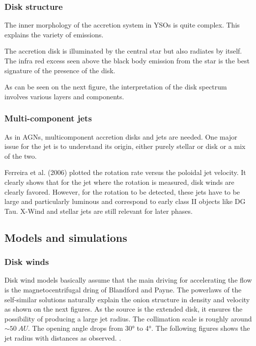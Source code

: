 \documentclass[10pt,a4paper,english,draft]{article}
\begin{document}
\subsubsection{Disk structure}

The inner morphology of the accretion system in YSOs is quite complex. This explains the variety of emissions.

The accretion disk is illuminated by the central star but also radiates by itself. The infra red excess seen above the black body emission from the star is the best signature of the presence of the disk.

As can be seen on the next figure, the interpretation of the disk spectrum involves various layers and components.

\subsubsection{Multi-component jets}
As in AGNs, multicomponent accretion disks and jets are needed. One major issue for the jet is to understand its origin, either purely stellar or disk or a mix of the two.

Ferreira et al. (2006) plotted the rotation rate versus the poloidal jet velocity. It clearly shows that for the jet where the rotation is measured, disk winds are clearly favored. However, for the rotation to be detected, these jets have to be large and particularly luminous and correspond to early class II objects like DG Tau. X-Wind and stellar jets are still relevant for later phases.
\subsection{Models and simulations}

\subsubsection{Disk winds}
Disk wind models basically assume that the main driving for accelerating the flow is the magnetocentrifugal dring of Blandford and Payne. The powerlaws of the self-similar solutions naturally explain the onion structure in density and velocity as shown on the next figures.
As the source is the extended disk, it ensures the possibility of producing a large jet radius. The collimation scale is roughly around $\sim \SI{50}{AU}$. The opening angle drops from \ang{30} to \ang{4}. The following figures shows the jet radius with distances as observed. .
\end{document}
